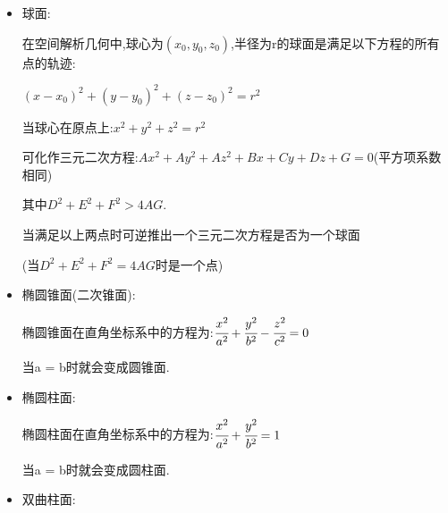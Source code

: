 \documentclass[UTF8,12pt]{ctexbook}
\begin{document}
{{{{\begin{itemize}
{\begin{itemize}
{                      用另一种方法来描述,类球面是一种椭球面.而椭球面的公式已经给出,其中a与b分别是椭球面在x轴与y轴的赤道半径,c是椭球面在z轴的极半径,这三个正实数的半径决定了椭球面的形状.以z轴为旋转轴的类球面a = b,他的方程为:

                      $\cfrac{x^2 + y^2}{a^2} + \cfrac{z^2}{c^2} = 1$

                      \begin{itemize}
                        \item 如果三个半径都相等,则此椭球面是圆球面$(a = c)$
                        \item 如果类球面的赤道半径小于极半径,则这是类球面中的长球面.$(a < c)$
                        \item 如果类球面的赤道半径大于极半径,则这是类球面中的扁球面.$(a > c)$
                      \end{itemize}
                      }
                \item {
                      球面:

                      在空间解析几何中,球心为$(x_0,y_0,z_0)$,半径为r的球面是满足以下方程的所有点的轨迹:

                      $(x - x_0)^2 + (y - y_0)^2 + (z - z_0)^2 = r^2$

                      当球心在原点上:$x^2 + y^2 + z^2 = r^2$

                      可化作三元二次方程:$Ax^2 + Ay^2 + Az^2 + Bx + Cy + Dz + G = 0$(平方项系数相同)

                      其中$D^2 + E^2 + F^2 > 4AG$.

                      当满足以上两点时可逆推出一个三元二次方程是否为一个球面

                      (当$D^2 + E^2 + F^2 = 4AG$时是一个点)
                      }
                \item {
                      椭圆锥面(二次锥面):

                      椭圆锥面在直角坐标系中的方程为:$\cfrac{x^2}{a^2} + \cfrac{y^2}{b^2} - \cfrac{z^2}{c^2} = 0$

                      当a = b时就会变成圆锥面.
                      }
                \item {
                      椭圆柱面:

                      椭圆柱面在直角坐标系中的方程为:$\cfrac{x^2}{a^2} + \cfrac{y^2}{b^2} = 1$

                      当a = b时就会变成圆柱面.
                      }
                \item {
                      双曲柱面:

}
\end{itemize}}
\end{itemize}}}}}
\end{document}
